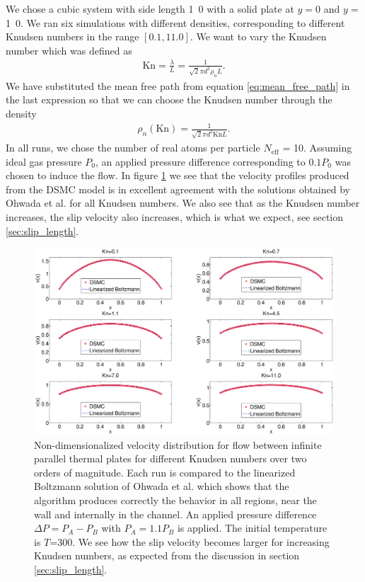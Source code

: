 We chose a cubic system with side length \unit{1.0}{\micro\meter} with a solid plate at $y=$\unit{0}{\micro\meter} and $y=$\unit{1.0}{\micro\meter}. We ran six simulations with different densities, corresponding to different Knudsen numbers in the range $[0.1, 11.0]$. We want to vary the Knudsen number which was defined as
\begin{align}
	\text{Kn} = \frac{\lambda}{L} = \frac{1}{\sqrt 2 \pi d^2 \rho_n L}.
\end{align}
We have substituted the mean free path from equation \eqref{eq:mean_free_path} in the last expression so that we can choose the Knudsen number through the density
\begin{align}
	\rho_n(\text{Kn}) = \frac{1}{\sqrt 2 \pi d^2 \text{Kn}L}.
\end{align}
In all runs, we chose the number of real atoms per particle $N_\text{eff}$ = 10. Assuming ideal gas pressure $P_0$, an applied pressure difference corresponding to $0.1P_0$ was chosen to induce the flow. In figure \ref{fig:dsmc_validation_poiseuille} we see that the velocity profiles produced from the DSMC model is in excellent agreement with the solutions obtained by Ohwada et al. for all Knudsen numbers. We also see that as the Knudsen number increases, the slip velocity also increases, which is what we expect, see section \ref{sec:slip_length}.
\begin{figure}[htpb]
\includegraphics[width=\textwidth, trim=6cm 0cm 5cm 0cm, clip]{DSMC/figures/validation_poiseuille.eps}
\centering
\caption{Non-dimensionalized velocity distribution for flow between infinite parallel thermal plates for different Knudsen numbers over two orders of magnitude. Each run is compared to the linearized Boltzmann solution of Ohwada et al. \cite{ohwada1989numerical} which shows that the algorithm produces correctly the behavior in all regions, near the wall and internally in the channel. An applied pressure difference $\Delta P = P_A - P_B$ with $P_A = 1.1P_B$ is applied. The initial temperature is $T$=\unit{300}{\kelvin}. We see how the slip velocity becomes larger for increasing Knudsen numbers, as expected from the discussion in section \ref{sec:slip_length}. }
\label{fig:dsmc_validation_poiseuille}
\end{figure}